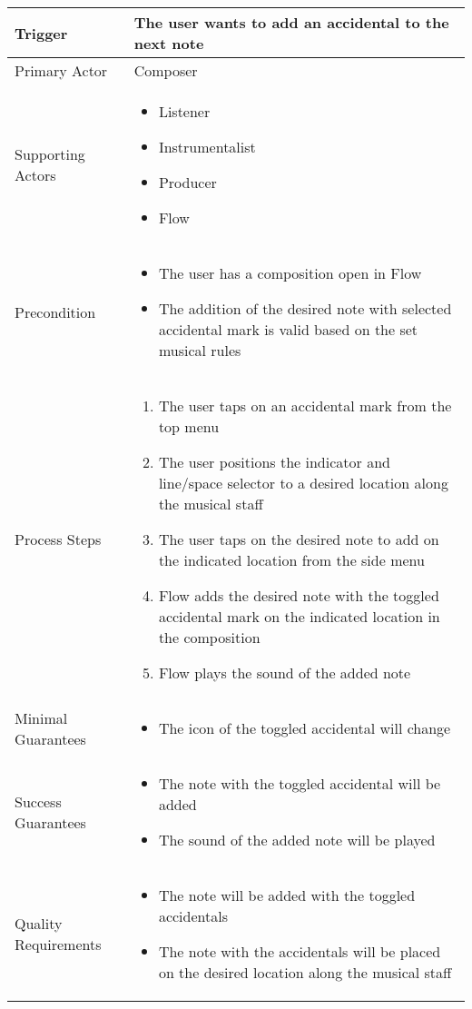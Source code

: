 \begin{longtable}{|X|X|}
\hline
Trigger & 
The user wants to add an accidental to the next note \\
\hline
Primary Actor & 
Composer \\
\hline
Supporting Actors & 
\begin{itemize}
\item Listener
\item Instrumentalist
\item Producer
\item Flow
\end{itemize} \\
\hline
Precondition & 
\begin{itemize}
\item The user has a composition open in Flow
\item The addition of the desired note with selected accidental mark is valid based on the set musical rules
\end{itemize} \\
\hline
Process Steps & 
\begin{enumerate}
\item The user taps on an accidental mark from the top menu
\item The user positions the indicator and line/space selector to a desired location along the musical staff
\item The user taps on the desired note to add on the indicated location from the side menu
\item Flow adds the desired note with the toggled accidental mark on the indicated location in the composition
\item Flow plays the sound of the added note
\end{enumerate} \\
\hline
Minimal Guarantees & 
\begin{itemize}
  \item The icon of the toggled accidental will change
\end{itemize} \\
\hline
Success Guarantees & 
\begin{itemize}
  \item The note with the toggled accidental will be added
  \item The sound of the added note will be played
\end{itemize} \\
\hline
Quality Requirements & 
\begin{itemize}
\item The note will be added with the toggled accidentals
\item The note with the accidentals will be placed on the desired location along the musical staff
\end{itemize} \\ 
\hline
\end{longtable}
